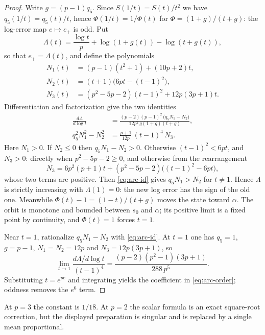 \documentclass[10pt,a4paper]{article}
\theoremstyle{plain}
\theoremstyle{remark}
\numberwithin{equation}{section}
\begin{document}
\begin{proof}
Write $g=(p-1)q_5$. Since $S(1/t)=S(t)/t^{2}$ we have $q_5(1/t)=q_5(t)/t$, hence
$\Phi(1/t)=1/\Phi(t)$ for $\Phi=(1+g)/(t+g)$: the log-error map $e\mapsto e_+$ is odd. Put
\[ \Lambda(t)=\frac{\log t}{p}+\log(1+g(t))-\log(t+g(t)), \]
so that $e_+=\Lambda(t)$, and define the polynomials
\begin{align*}
N_1(t)&=(p-1)(t^{2}+1)+(10p+2)t,\\
N_2(t)&=(t+1)\bigl(6pt-(t-1)^{2}\bigr),\\
N_3(t)&=(p^{2}-5p-2)(t-1)^{2}+12p(3p+1)t .
\end{align*}
Differentiation and factorization give the two identities
\begin{align}
\frac{d\Lambda}{d\log t}&=\frac{(p-2)(p-1)^{2}\,\bigl(q_5N_1-N_2\bigr)}{12p^{2}\,g(1+g)(t+g)},\label{eq:arc-der}\\
q_5^{2}N_1^{2}-N_2^{2}&=\frac{p+1}{12p}\,(t-1)^{4}\,N_3 .\label{eq:arc-id}
\end{align}
Here $N_1>0$. If $N_2\le0$ then $q_5N_1-N_2>0$. Otherwise $(t-1)^{2}<6pt$, and $N_3>0$: directly when
$p^{2}-5p-2\ge0$, and otherwise from the rearrangement
\[ N_3=6p^{2}(p+1)t+(p^{2}-5p-2)\bigl((t-1)^{2}-6pt\bigr), \]
whose two terms are positive. Then \eqref{eq:arc-id} gives $q_5N_1>N_2$ for $t\neq1$. Hence $\Lambda$
is strictly increasing with $\Lambda(1)=0$: the new log error has the sign of the old one. Meanwhile
$\Phi(t)-1=(1-t)/(t+g)$ moves the state toward $\alpha$. The orbit is monotone and bounded between
$s_0$ and $\alpha$; its positive limit is a fixed point by continuity, and $\Phi(t)=1$ forces $t=1$.

Near $t=1$, rationalize $q_5N_1-N_2$ with \eqref{eq:arc-id}. At $t=1$ one has $q_5=1$, $g=p-1$,
$N_1=N_2=12p$ and $N_3=12p(3p+1)$, so
\[ \lim_{t\to1}\frac{d\Lambda/d\log t}{(t-1)^{4}}=\frac{(p-2)(p^{2}-1)(3p+1)}{288\,p^{5}} . \]
Substituting $t=e^{pe}$ and integrating yields the coefficient in \eqref{eq:arc-order}; oddness removes
the $e^{6}$ term.
\end{proof}

At $p=3$ the constant is $1/18$. At $p=2$ the scalar formula is an exact square-root correction, but
the displayed preparation is singular and is replaced by a single mean proportional.





\end{document}
